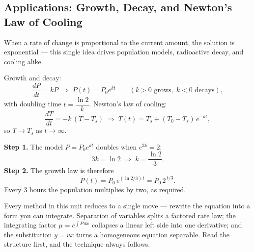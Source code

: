 \documentclass[11pt]{article}
\begin{document}
\subsection{Applications: Growth, Decay, and Newton's Law of Cooling}

When a rate of change is proportional to the current amount, the solution is
exponential --- this single idea drives population models, radioactive decay,
and cooling alike.

\begin{formulabox}
Growth and decay:
\[
    \frac{dP}{dt} = kP \;\Longrightarrow\; P(t) = P_{0}e^{kt}
    \qquad (k>0 \text{ grows},\; k<0 \text{ decays}),
\]
with doubling time $t = \dfrac{\ln 2}{k}$. Newton's law of cooling:
\[
    \frac{dT}{dt} = -k\,(T - T_{s}) \;\Longrightarrow\;
    T(t) = T_{s} + (T_{0} - T_{s})\,e^{-kt},
\]
so $T \to T_{s}$ as $t \to \infty$.
\end{formulabox}

\begin{examplebox}
\textbf{Step 1.} The model $P = P_{0}e^{kt}$ doubles when $e^{3k} = 2$:
\[ 3k = \ln 2 \;\Longrightarrow\; k = \frac{\ln 2}{3}. \]
\textbf{Step 2.} The growth law is therefore
\[ P(t) = P_{0}\,e^{(\ln 2 / 3)\,t} = P_{0}\,2^{\,t/3}. \]
Every $3$ hours the population multiplies by two, as required.
\end{examplebox}

\vspace{0.8em}
\begin{conceptbox}
Every method in this unit reduces to a single move --- rewrite the equation
into a form you can integrate. \textcolor{accentorange}{Separation of variables}
splits a factored rate law; the \textcolor{accentorange}{integrating factor
$\mu = e^{\int P\,dx}$} collapses a linear left side into one derivative; and
the \textcolor{accentorange}{substitution $y = vx$} turns a homogeneous equation
separable. Read the structure first, and the technique always follows.
\end{conceptbox}
\end{document}
